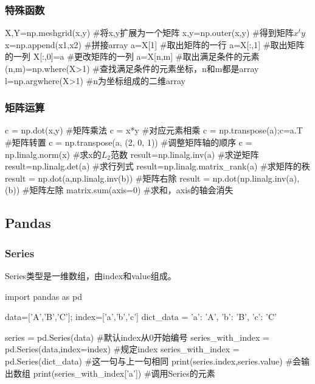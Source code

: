    \subsubsection{特殊函数}  
      \begin{codeblock}[language=python, caption={Advanced operations in numpy}]
        X,Y=np.meshgrid(x,y) #将x,y扩展为一个矩阵
        x,y=np.outer(x,y) #得到矩阵$x^{t}y$
        x=np.append(x1,x2) #拼接array
        a=X[1] #取出矩阵的一行
        a=X[:,1] #取出矩阵的一列
        X[:,0]=a #更改矩阵的一列
        a=X[n,m] #取出满足条件的元素
        (n,m)=np.where(X>1) #查找满足条件的元素坐标，n和m都是array
        l=np.argwhere(X>1) #n为坐标组成的二维array
      \end{codeblock}

    \subsubsection{矩阵运算}
      \begin{codeblock}[language=python, caption={calculation of matrix}]
        c = np.dot(x,y) #矩阵乘法
        c = x*y #对应元素相乘
        c = np.transpose(a);c=a.T #矩阵转置
        c = np.transpose(a, (2, 0, 1)) #调整矩阵轴的顺序
        c = np.linalg.norm(x) #求x的$L_2$范数
        result=np.linalg.inv(a) #求逆矩阵
        result=np.linalg.det(a) #求行列式
        result=np.linalg.matrix_rank(a) #求矩阵的秩
        result = np.dot(a,np.linalg.inv(b)) #矩阵右除
        result = np.dot(np.linalg.inv(a),(b)) #矩阵左除
        matrix.sum(axis=0) #求和，axis的轴会消失
      \end{codeblock}

  \subsection{Pandas}
    \subsubsection{Series}
      Series类型是一维数组，由index和value组成。
      \begin{codeblock}[language=python, caption={Series in Pandas}]
        import pandas as pd

        data=['A','B','C']; index=['a','b','c']
        dict_data = {'a': 'A', 'b': 'B', 'c': 'C'} 
        
        series = pd.Series(data) #默认index从0开始编号
        series_with_index = pd.Series(data,index=index) #规定index
        series_with_index = pd.Series(dict_data) #这一句与上一句相同
        print(series.index,series.value) #会输出数组
        print(series_with_index['a']) #调用Series的元素
      \end{codeblock}

